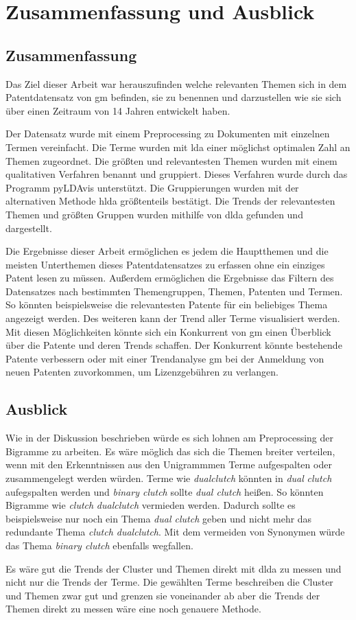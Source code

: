 \chapter{Zusammenfassung und Ausblick}




\section{Zusammenfassung}

Das Ziel dieser Arbeit war herauszufinden welche relevanten Themen sich in dem Patentdatensatz von \gls{gm} befinden, sie zu benennen und darzustellen wie sie sich über einen Zeitraum von 14 Jahren entwickelt haben.

Der Datensatz wurde mit einem Preprocessing zu Dokumenten mit einzelnen Termen vereinfacht. Die Terme wurden mit \gls{lda} einer möglichst optimalen Zahl an Themen zugeordnet. Die größten und relevantesten Themen wurden mit einem qualitativen Verfahren benannt und gruppiert. Dieses Verfahren wurde durch das Programm \gls{pyLDAvis} unterstützt. Die Gruppierungen wurden mit der alternativen Methode \gls{hlda} größtenteils bestätigt. Die Trends der relevantesten Themen und größten Gruppen wurden mithilfe von \gls{dlda} gefunden und dargestellt.

Die Ergebnisse dieser Arbeit ermöglichen es jedem die Hauptthemen und die meisten Unterthemen dieses Patentdatensatzes zu erfassen ohne ein einziges Patent lesen zu müssen. Außerdem ermöglichen die Ergebnisse das Filtern des Datensatzes nach bestimmten Themengruppen, Themen, Patenten und Termen. So könnten beispielsweise die relevantesten Patente für ein beliebiges Thema angezeigt werden. Des weiteren kann der Trend aller Terme visualisiert werden. Mit diesen Möglichkeiten könnte sich ein Konkurrent von \gls{gm} einen Überblick über die Patente und deren Trends schaffen. Der Konkurrent könnte bestehende Patente verbessern oder mit einer Trendanalyse \gls{gm} bei der Anmeldung von neuen Patenten zuvorkommen, um Lizenzgebühren zu verlangen.



\section{Ausblick}

Wie in der Diskussion beschrieben würde es sich lohnen am Preprocessing der Bigramme zu arbeiten. Es wäre möglich das sich die Themen breiter verteilen, wenn mit den Erkenntnissen aus den Unigrammmen Terme aufgespalten oder zusammengelegt werden würden. Terme wie \emph{dualclutch} könnten in \emph{dual} \emph{clutch} aufegspalten werden und \emph{binary clutch} sollte \emph{dual clutch} heißen. So könnten Bigramme wie \emph{clutch} \emph{dualclutch} vermieden werden. Dadurch sollte es beispielsweise nur noch ein Thema \emph{dual clutch} geben und nicht mehr das redundante Thema \emph{clutch dualclutch}. Mit dem vermeiden von Synonymen würde das Thema \emph{binary clutch} ebenfalls wegfallen.

Es wäre gut die Trends der Cluster und Themen direkt mit \gls{dlda} zu messen und nicht nur die Trends der Terme. Die gewählten Terme beschreiben die Cluster und Themen zwar gut und grenzen sie voneinander ab aber die Trends der Themen direkt zu messen wäre eine noch genauere Methode. 







